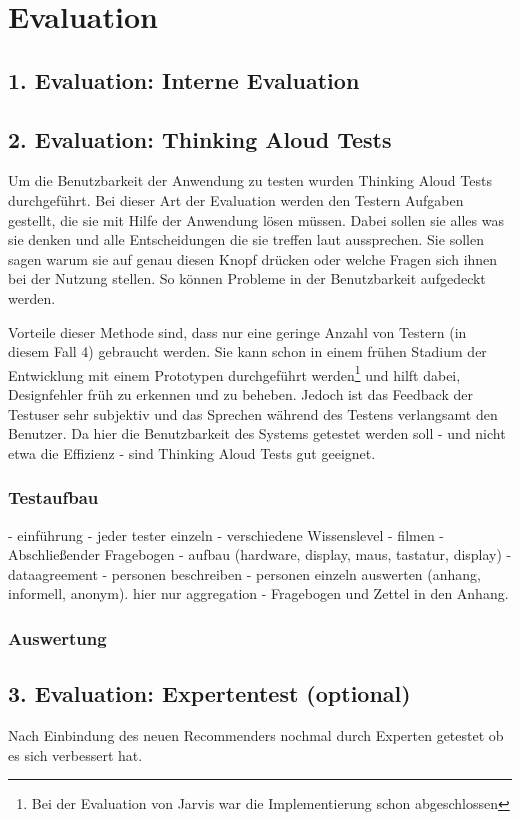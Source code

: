 \section{Evaluation}
 \subsection{1. Evaluation: Interne Evaluation}

 \subsection{2. Evaluation: Thinking Aloud Tests}
Um die Benutzbarkeit der Anwendung zu testen wurden Thinking Aloud Tests durchgeführt. Bei dieser Art der Evaluation werden den Testern Aufgaben gestellt, die sie mit Hilfe der Anwendung lösen müssen. Dabei sollen sie alles was sie denken und alle Entscheidungen die sie treffen laut aussprechen. Sie sollen sagen warum sie auf genau diesen Knopf drücken oder welche Fragen sich ihnen bei der Nutzung stellen. So können Probleme in der Benutzbarkeit aufgedeckt werden.

Vorteile dieser Methode sind, dass nur eine geringe Anzahl von Testern (in diesem Fall 4) gebraucht werden. Sie kann schon in einem frühen Stadium der Entwicklung mit einem Prototypen durchgeführt werden\footnote{Bei der Evaluation von Jarvis war die Implementierung schon abgeschlossen} und hilft dabei, Designfehler früh zu erkennen und zu beheben. Jedoch ist das Feedback der Testuser sehr subjektiv und das Sprechen während des Testens verlangsamt den Benutzer. Da hier die Benutzbarkeit des Systems getestet werden soll - und nicht etwa die Effizienz - sind Thinking Aloud Tests gut geeignet.

 \subsubsection{Testaufbau}
 - einführung
 - jeder tester einzeln
 - verschiedene Wissenslevel
 - filmen
 - Abschließender Fragebogen
  - aufbau (hardware, display, maus, tastatur, display)
  - dataagreement
  - personen beschreiben
  - personen einzeln auswerten (anhang, informell, anonym). hier nur aggregation
  - Fragebogen und Zettel in den Anhang.
 \subsubsection{Auswertung}


 \subsection{3. Evaluation: Expertentest (optional)}
 Nach Einbindung des neuen Recommenders nochmal durch Experten getestet ob es sich verbessert hat.